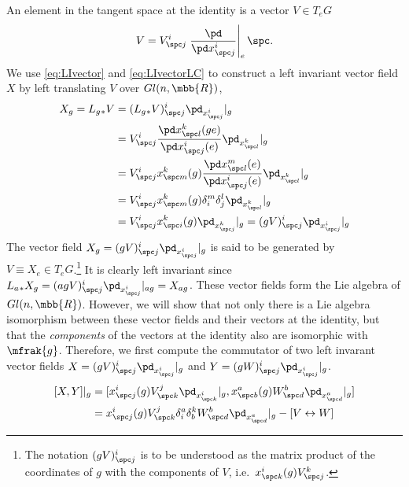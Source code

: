 \documentclass[10pt,reqno]{amsart}
\numberwithin{equation}{section}
\begin{document}
\begin{example}
	An element in the tangent space at the identity is a vector $V 
	\in T_e G$
	\begin{equation}
		V = V^i_{\spc j} \left.\frac{\pd}{\pd x^i_{\spc j}}\right|_e 
		\spc.
	\end{equation}
	We use \eqref{eq:LIvector} and \eqref{eq:LIvectorLC} to 
	construct a left invariant vector field $X$ by left translating 
	$V$ over $Gl(n,\mbb{R})$,
	\begin{displaymath}
		\begin{split}
			X_g = L_g{}_\ast V &= (L_g{}_\ast V)^i_{\spc j} 
			\pd_{x^i_{\spc j}}|_g \\
			&= V^i_{\spc j} \frac{\pd x^k_{\spc l}(ge)}{\pd x^i_{\spc 
					j}(e)} \pd_{x^k_{\spc l}}|_g \\
			&= V^i_{\spc j} x^k_{\spc m}(g) \frac{\pd x^m_{\spc 
					l}(e)}{\pd x^i_{\spc j}(e)} \pd_{x^k_{\spc l}}|_g \\
			&= V^i_{\spc j} x^k_{\spc m}(g) \delta^m_i \delta^l_j 
			\pd_{x^k_{\spc l}}|_g \\
			&= V^i_{\spc j} x^k_{\spc i}(g) \pd_{x^k_{\spc j}}|_g
			= (gV)^i_{\spc j} \pd_{x^i_{\spc j}}|_g
		\end{split}
	\end{displaymath}   
	The vector field $X_g = (gV)^i_{\spc j} \pd_{x^i_{\spc j}}|_g$ 
	is said to be generated by $V \equiv X_e \in T_e 
	G$.\footnote{The notation $(gV)^i_{\spc j}$ is to be understood 
		as the matrix product of the coordinates of $g$ with the 
		components of $V$, i.e.\ $x^i_{\spc k}(g)V^k_{\spc j}$.}
	It is clearly left invariant since $L_a{}_\ast X_g = 
	(agV)^i_{\spc j} \pd_{x^i_{\spc j}}|_{ag} = X_{ag}$.  These 
	vector fields form the Lie algebra of $Gl(n,\mbb{R})$.  
	However, we will show that not only there is a Lie algebra 
	isomorphism between these vector fields and their vectors at 
	the identity, but that the \emph{components} of the vectors at 
	the identity also are isomorphic with $\mfrak{g}$.  Therefore, 
	we first compute the commutator of two left invarant vector 
	fields $X = (gV)^i_{\spc j} \pd_{x^i_{\spc j}}|_g$ and $Y = 
	(gW)^i_{\spc j} \pd_{x^i_{\spc j}}|_g$.
	\begin{displaymath}
		\begin{split}
			[X,Y]|_g &= [x^i_{\spc j}(g)V^j_{\spc k} \pd_{x^i_{\spc 
					k}}|_g, x^a_{\spc b}(g)W^b_{\spc d} \pd_{x^a_{\spc 
					d}}|_g] \\
	&= x^i_{\spc j}(g)V^j_{\spc k} \delta^a_i \delta^k_b W^b_{\spc 
		d} \pd_{x^a_{\spc d}}|_g - [V \leftrightarrow W] \\

\end{split}
\end{displaymath}
\end{example}
\end{document}
